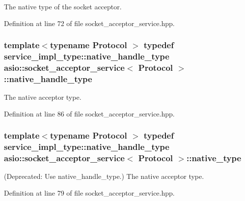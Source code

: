 The native type of the socket acceptor. 



Definition at line 72 of file socket\+\_\+acceptor\+\_\+service.\+hpp.

\hypertarget{classasio_1_1socket__acceptor__service_a48826fea49fd08ba8d3ee51697f1a092}{}
\subsubsection[{native\+\_\+handle\+\_\+type}]{\setlength{\rightskip}{0pt plus 5cm}template$<$typename Protocol $>$ typedef {\bf service\+\_\+impl\+\_\+type\+::native\+\_\+handle\+\_\+type} {\bf asio\+::socket\+\_\+acceptor\+\_\+service}$<$ Protocol $>$\+::{\bf native\+\_\+handle\+\_\+type}}\label{classasio_1_1socket__acceptor__service_a48826fea49fd08ba8d3ee51697f1a092}


The native acceptor type. 



Definition at line 86 of file socket\+\_\+acceptor\+\_\+service.\+hpp.

\hypertarget{classasio_1_1socket__acceptor__service_a26cf6dae27417c057eca8c60a65950ed}{}
\subsubsection[{native\+\_\+type}]{\setlength{\rightskip}{0pt plus 5cm}template$<$typename Protocol $>$ typedef {\bf service\+\_\+impl\+\_\+type\+::native\+\_\+handle\+\_\+type} {\bf asio\+::socket\+\_\+acceptor\+\_\+service}$<$ Protocol $>$\+::{\bf native\+\_\+type}}\label{classasio_1_1socket__acceptor__service_a26cf6dae27417c057eca8c60a65950ed}


(Deprecated\+: Use native\+\_\+handle\+\_\+type.) The native acceptor type. 



Definition at line 79 of file socket\+\_\+acceptor\+\_\+service.\+hpp.


